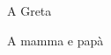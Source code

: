 \thispagestyle{empty}
{}

\vspace*{3cm}

\begin{center}
    \LARGE{A Greta}
\end{center}

\medskip

\begin{center}
    \LARGE{A mamma e papà}
\end{center}